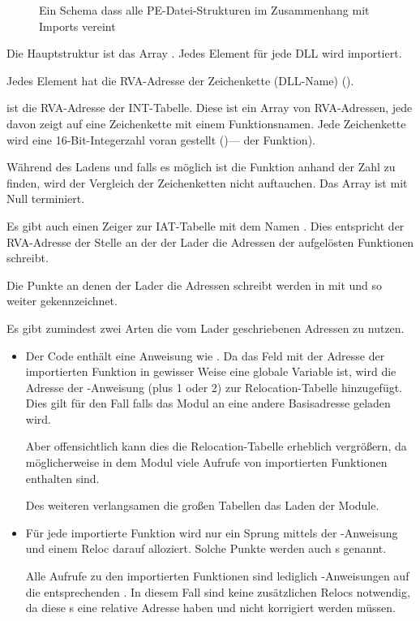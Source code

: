\begin{figure}[H]
\centering
{}
\caption{
Ein Schema dass alle PE-Datei-Strukturen im Zusammenhang mit Imports vereint}
\end{figure}

Die Hauptstruktur ist das Array . Jedes Element für
jede DLL wird importiert.

Jedes Element hat die \ac{RVA}-Adresse der Zeichenkette (DLL-Name) ().

 ist die \ac{RVA}-Adresse der \ac{INT}-Tabelle. Diese ist
ein Array von \ac{RVA}-Adressen, jede davon zeigt auf eine Zeichenkette mit einem
Funktionsnamen. Jede Zeichenkette wird eine 16-Bit-Integerzahl voran gestellt
()--- der Funktion).

Während des Ladens und falls es möglich ist die Funktion anhand der Zahl zu finden,
wird der Vergleich der Zeichenketten nicht auftauchen. Das Array ist mit Null terminiert.

Es gibt auch einen Zeiger zur \ac{IAT}-Tabelle mit dem Namen . Dies
entspricht der \ac{RVA}-Adresse der Stelle an der der Lader die Adressen der aufgelösten
Funktionen schreibt.

Die Punkte an denen der Lader die Adressen schreibt werden in \IDA mit 
und so weiter gekennzeichnet.

Es gibt zumindest zwei Arten die vom Lader geschriebenen Adressen zu nutzen.

\begin{itemize}
\item Der Code enthält eine Anweisung wie . Da das Feld
mit der Adresse der importierten Funktion in gewisser Weise eine globale Variable
ist, wird die Adresse der -Anweisung (plus 1 oder 2) zur Relocation-Tabelle
hinzugefügt. Dies gilt für den Fall falls das Modul an eine andere Basisadresse
geladen wird.

Aber offensichtlich kann dies die Relocation-Tabelle erheblich vergrößern, da
möglicherweise in dem Modul viele Aufrufe von importierten Funktionen enthalten sind.

Des weiteren verlangsamen die großen Tabellen das Laden der Module.

\item Für jede importierte Funktion wird nur ein Sprung mittels der \JMP-Anweisung
und einem Reloc darauf alloziert.
Solche Punkte werden auch s genannt.

Alle Aufrufe zu den importierten Funktionen sind lediglich \CALL-Anweisungen auf
die entsprechenden .
In diesem Fall sind keine zusätzlichen Relocs notwendig, da diese \CALL{}s eine
relative Adresse haben und nicht korrigiert werden müssen.
\end{itemize}

